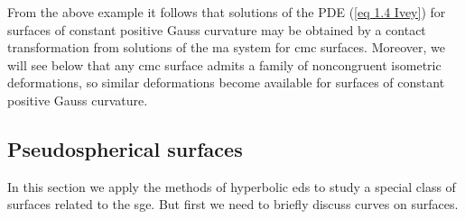 From the above example it follows that solutions of the PDE (\ref{eq 1.4 Ivey}) for surfaces of constant positive Gauss curvature may be obtained by a contact transformation from solutions of the \gls{ma} system for \gls{cmc} surfaces. Moreover, we will see below that any \gls{cmc} surface admits a family of noncongruent isometric deformations, so similar deformations become available for surfaces of constant positive Gauss curvature.








\subsection{Pseudospherical surfaces}\label{sec: pseudospherical surfaces}

In this section we apply the methods of hyperbolic \gls{eds} to study a special class of surfaces related to the \gls{sge}. But first we need to briefly discuss curves on surfaces.

